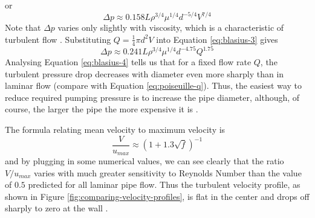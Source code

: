 \documentclass[10pt]{article} %
\numberwithin{equation}{section} %
\begin{document}
\begin{multicols}{2}
\begin{equation}
\end{equation}
or
\begin{equation} \label{eq:blasius-3}
\Delta p \approx 0.158 L \rho^{3/4} \mu^{1/4} d^{-5/4} V^{7/4}
\end{equation}
Note that $\Delta p$ varies only slightly with viscosity, which is a characteristic of turbulent flow \cite{fluid-mechanics}. Substituting $Q = \frac{1}{4} \pi d^{2} V$ into Equation \ref{eq:blasius-3} gives
\begin{equation} \label{eq:blasius-4}
\Delta p \approx 0.241 L \rho^{3/4} \mu^{1/4} d^{-4.75} Q^{1.75}
\end{equation}
Analysing Equation \ref{eq:blasius-4} tells us that for a fixed flow rate $Q$, the turbulent pressure drop decreases with diameter even more sharply than in laminar flow (compare with Equation \ref{eq:poiseuille-q}). Thus, the easiest way to reduce required pumping pressure is to increase the pipe diameter, although, of course, the larger the pipe the more expensive it is \cite{fluid-mechanics}.

The formula relating mean velocity to maximum velocity is
\begin{equation}
\frac{V}{u_{max}} \approx (1+1.3 \sqrt{f})^{-1}
\end{equation}
and by plugging in some numerical values, we can see clearly that the ratio $V/u_{max}$ varies with much greater sensitivity to Reynolds Number than the value of $0.5$ predicted for all laminar pipe flow. Thus the turbulent velocity profile, as shown in Figure \ref{fig:comparing-velocity-profiles}, is flat in the center and drops off sharply to zero at the wall \cite{fluid-mechanics}.


\end{multicols}
\end{document}
